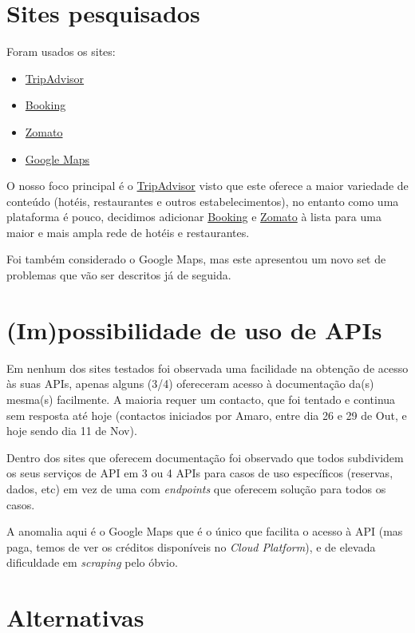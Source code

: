 \documentclass[a4paper,10pt]{article}
\begin{document}
\section{Sites pesquisados}

Foram usados os sites:
\begin{itemize}
  \item \href{https://www.tripadvisor.com/}{TripAdvisor}
  \item \href{https://www.booking.com/}{Booking}
  \item \href{https://www.zomato.com/}{Zomato}
  \item \href{https://developers.google.com/maps}{Google Maps}
\end{itemize}

O nosso foco principal é o \href{https://www.tripadvisor.com/}{TripAdvisor} visto que este oferece a maior variedade de conteúdo (hotéis, restaurantes e outros estabelecimentos), no entanto como uma plataforma é pouco, decidimos adicionar \href{https://www.booking.com/}{Booking} e \href{https://www.zomato.com/}{Zomato} à lista para uma maior e mais ampla rede de hotéis e restaurantes.

Foi também considerado o Google Maps, mas este apresentou um novo set de problemas que vão ser descritos já de seguida.

\section{(Im)possibilidade de uso de APIs}

Em nenhum dos sites testados foi observada uma facilidade na obtenção de acesso às suas APIs, apenas alguns (3/4) ofereceram acesso à documentação da(s) mesma(s) facilmente. A maioria requer um contacto, que foi tentado e continua sem resposta até hoje (contactos iniciados por Amaro, entre dia 26 e 29 de Out, e hoje sendo dia 11 de Nov).

Dentro dos sites que oferecem documentação foi observado que todos subdividem os seus serviços de API em 3 ou 4 APIs para casos de uso específicos (reservas, dados, etc) em vez de uma com \textit{endpoints} que oferecem solução para todos os casos.

A anomalia aqui é o Google Maps que é o único que facilita o acesso à API (mas paga, temos de ver os créditos disponíveis no \textit{Cloud Platform}), e de elevada dificuldade em \textit{scraping} pelo óbvio.

\section{Alternativas}
\end{document}
